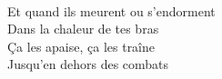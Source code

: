 \\
Et quand ils meurent ou s'endorment\\
Dans la chaleur de tes bras\\
Ça les apaise, ça les traîne\\
Jusqu'en dehors des combats\\
